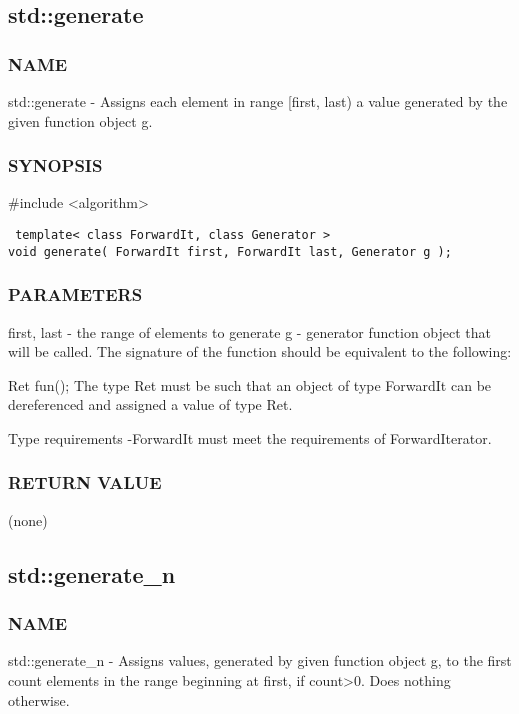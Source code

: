 \subsection{std::generate}

\subsubsection{NAME}
std::generate - Assigns each element in range [first, last) a value generated by the given function object g.

\subsubsection{SYNOPSIS}
\#include <algorithm>

\begin{lstlisting}
 template< class ForwardIt, class Generator >
void generate( ForwardIt first, ForwardIt last, Generator g );
\end{lstlisting}

\subsubsection{PARAMETERS}
first, last - the range of elements to generate
g - generator function object that will be called.
The signature of the function should be equivalent to the following:

 Ret fun();
The type Ret must be such that an object of type ForwardIt can be dereferenced and assigned a value of type Ret.

 Type requirements
 -ForwardIt must meet the requirements of ForwardIterator.

\subsubsection{RETURN VALUE}
(none)



\subsection{std::generate\_n}

\subsubsection{NAME}
std::generate\_n - Assigns values, generated by given function object g, to the first count elements in the range beginning at first, if count>0. Does nothing otherwise.

